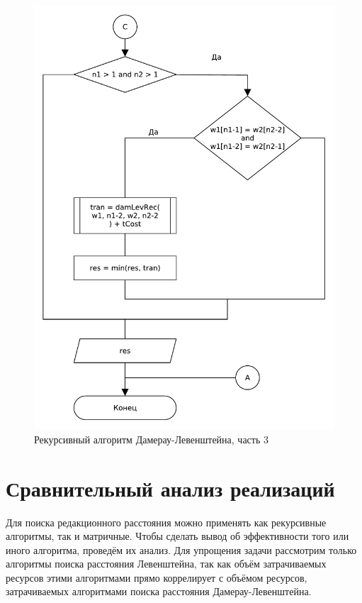 \begin{figure}[H]
    \centering
    \includegraphics[scale=0.75]{pdf/damerau-levenshteainrec-part3.pdf}
    \caption{Рекурсивный алгоритм Дамерау-Левенштейна, часть 3}
\end{figure}

\section{Сравнительный анализ реализаций}
Для поиска редакционного расстояния можно применять как рекурсивные алгоритмы, так и матричные. Чтобы сделать вывод об эффективности того или иного алгоритма, проведём их анализ. Для упрощения задачи рассмотрим только алгоритмы поиска расстояния Левенштейна, так как объём затрачиваемых ресурсов этими алгоритмами прямо коррелирует с объёмом ресурсов, затрачиваемых алгоритмами поиска расстояния Дамерау-Левенштейна.

